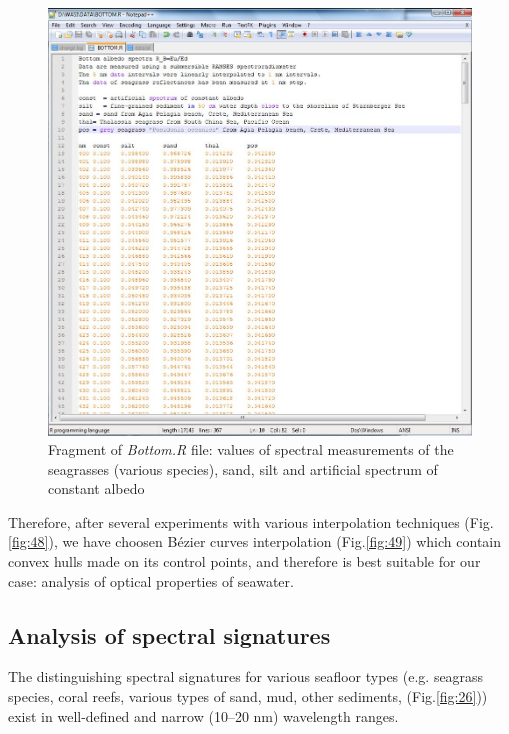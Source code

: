 \documentclass[10pt, a4paper]{article}
\begin{document}
\begin{figure}[H]
\centering
\includegraphics[scale=0.25]{Fig-28.jpg}
\caption{Fragment of \textit{Bottom.R} file: values of spectral measurements of the
seagrasses (various species), sand, silt and artificial spectrum of constant albedo}
\label{fig:25}
\end{figure}

Therefore, after several experiments with
various interpolation techniques (Fig.\ref{fig:48}), we have choosen Bézier curves interpolation (Fig.\ref{fig:49}) which contain convex
hulls made on its control points, and therefore is best suitable for our case: analysis of optical
properties of seawater.
%
\subsection{Analysis of spectral signatures}
The distinguishing spectral signatures for various seafloor types (e.g. seagrass species, coral reefs,
various types of sand, mud, other sediments, (Fig.\ref{fig:26})) exist in well-defined and narrow (10–20 nm)
wavelength ranges. 
\end{document}

